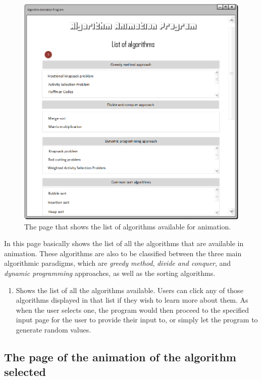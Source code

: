 \begin{figure}[H]
\centering
\hspace*{-0.5cm}
\includegraphics[scale=0.8]{images/report_images/uiListOfAlgorithms.png}
\caption{The page that shows the list of algorithms available for animation.}
\label{uiListOfAlgorithms}
\end{figure}

In this page basically shows the list of all the algorithms that are available in animation. These algorithms are also to be classified between the three main algorithmic paradigms, which are \textit{greedy method}, \textit{divide and conquer}, and \textit{dynamic programming} approaches, as well as the sorting algorithms.

\begin{enumerate}
\item Shows the list of all the algorithms available. Users can click any of those algorithms displayed in that list if they wish to learn more about them. As when the user selects one, the program would then proceed to the specified input page for the user to provide their input to, or simply let the program to generate random values.
\end{enumerate}

\subsection{The page of the animation of the algorithm selected}

